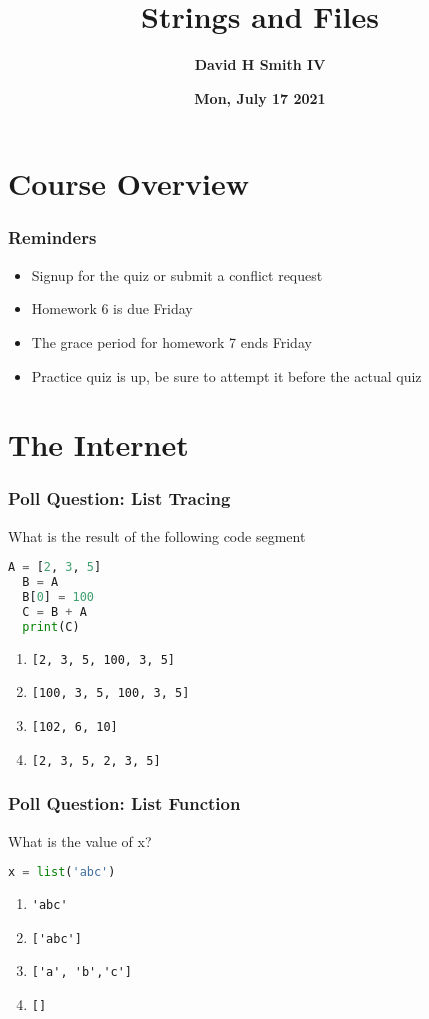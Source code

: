 \documentclass{beamer}
\title{\textbf{Strings and Files}}
\author{\textbf{David H Smith IV}}
\institute[\textbf{UIUC}]{\textbf{University of Illinois Urbana-Champaign}}
\date{\textbf{Mon, July 17 2021}}
\begin{document}
\frame{\titlepage}

\section{Course Overview}

%
%
\begin{frame}
  \frametitle{Reminders}
  \begin{itemize}
    \item Signup for the quiz or submit a conflict request
    \item Homework 6 is due Friday 
    \item The grace period for homework 7 ends Friday
    \item Practice quiz is up, be sure to attempt it before the actual quiz
  \end{itemize}
\end{frame}

\section{The Internet}

%
%
\begin{frame}[fragile]
  \frametitle{Poll Question: List Tracing}
  What is the result of the following code segment
  \begin{lstlisting}[language=Python, autogobble]
  A = [2, 3, 5]
  B = A
  B[0] = 100
  C = B + A
  print(C)
  \end{lstlisting}
  \vfill
  \begin{enumerate}[A]
    \item \lstinline|[2, 3, 5, 100, 3, 5]|
    \item \lstinline|[100, 3, 5, 100, 3, 5]|
    \item \lstinline|[102, 6, 10]|
    \item \lstinline|[2, 3, 5, 2, 3, 5]|
  \end{enumerate}
\end{frame}

%
%
\begin{frame}[fragile]
  \frametitle{Poll Question: List Function}
  What is the value of x?
  \begin{lstlisting}[language=Python, autogobble]
  x = list('abc')
  \end{lstlisting}
  \vfill
  \begin{enumerate}[A]
    \item \lstinline|'abc'|
    \item \lstinline|['abc']|
    \item \lstinline|['a', 'b','c']|
    \item \lstinline|[]|
  \end{enumerate}
\end{frame}
\end{document}
